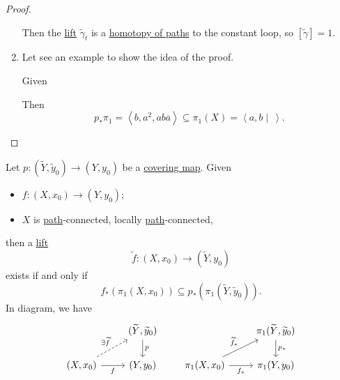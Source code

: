 \begin{proof}
\begin{enumerate}[(1)]
		      \par Then the \hyperref[def:lift]{lift} \(\widetilde{\gamma} _{t}\) is a \hyperref[def:homotopy-path]{homotopy of paths}
		      to the constant loop, so \([\widetilde{\gamma} ] = 1\).
		\item Let see an example to show the idea of the proof.
		      \begin{eg}
			      Given
			      \begin{figure}[H]
				      \centering
				      \label{fig:eg:lec14:2}
			      \end{figure}
			      Then
			      \[
				      p_*\pi _1 = \left< b, a^{2} , ab \overline{a}  \right> \subseteq \pi _1(X) = \left< a, b \mid \ \right>.
			      \]
		      \end{eg}
	\end{enumerate}
\end{proof}
\begin{proposition}\label{prop:lifting-criterion}
	Let \(p\colon (\widetilde{Y} , \widetilde{y} _0)\to (Y, y_0 )\) be a \hyperref[def:covering-map]{covering map}. Given
	\begin{itemize}
		\item \(f\colon (X, x_0) \to (Y, y_0)\);
		\item \(X\) is \hyperref[def:path]{path}-connected, locally \hyperref[def:path]{path}-connected,
	\end{itemize}
	then a \hyperref[def:lift]{lift}
	\[
		\widetilde{f} \colon (X, x_0)\to (\widetilde{Y} , y_0)
	\]
	exists if and only if
	\[
		f_*\left(\pi _1(X, x_0)\right)\subseteq p_*(\pi _1(\widetilde{Y} , \widetilde{y} _0 )).
	\]
	In diagram, we have
	\[
		\begin{tikzcd}
			& {(\widetilde{Y}, \widetilde{y}_0)} \\
			{(X, x_0)} & {(Y, y_0)}
			\arrow["p", from=1-2, to=2-2]
			\arrow["f"', from=2-1, to=2-2]
			\arrow["{\exists \widetilde{f}}", dashed, from=2-1, to=1-2]
		\end{tikzcd}\qquad
		\begin{tikzcd}
			& {\pi_1(\widetilde{Y}, \widetilde{y}_0)} \\
			{\pi_1(X, x_0)} & {\pi_1(Y, y_0)}
			\arrow["{f_\ast}"', from=2-1, to=2-2]
			\arrow["{p_\ast}", from=1-2, to=2-2]
			\arrow["{\widetilde{f}_\ast}", from=2-1, to=1-2]
		\end{tikzcd}
	\]
\end{proposition}